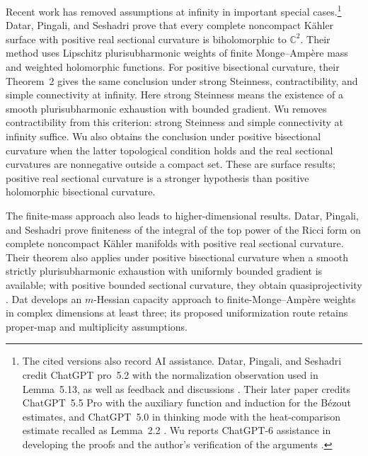 Recent work has removed assumptions at infinity in important special
cases.\footnote{The cited versions also record AI assistance.
Datar, Pingali, and Seshadri credit ChatGPT pro~5.2 with the normalization
observation used in Lemma~5.13, as well as feedback and discussions
\cite[Section~1.1 and Acknowledgments]{DatarPingaliSeshadri}.
Their later paper credits ChatGPT~5.5 Pro with the auxiliary function
and induction for the B\'ezout estimates, and ChatGPT~5.0 in thinking
mode with the heat-comparison estimate recalled as Lemma~2.2
\cite[Sections~1--3]{DatarPingaliSeshadriTop}.
Wu reports ChatGPT-6 assistance in developing the proofs and the
author's verification of the arguments
\cite[Acknowledgments]{WuConditional}.}
Datar, Pingali, and Seshadri
\cite[Theorem~1]{DatarPingaliSeshadri} prove that every complete noncompact
K\"ahler surface with positive real sectional curvature is biholomorphic
to $\mathbb C^2$. Their method uses Lipschitz plurisubharmonic weights of
finite Monge--Amp\`ere mass and weighted holomorphic functions.
For positive bisectional curvature, their Theorem~2 gives the same
conclusion under strong Steinness, contractibility, and simple
connectivity at infinity. Here strong Steinness means the existence of
a smooth plurisubharmonic exhaustion with bounded gradient.
Wu \cite[Corollaries~1.5--1.6]{WuConditional} removes contractibility
from this criterion: strong Steinness and simple connectivity at infinity
suffice. Wu also obtains the conclusion under positive bisectional curvature
when the latter topological condition holds and the real sectional
curvatures are nonnegative outside a compact set. These are surface results; positive real sectional
curvature is a stronger hypothesis than positive holomorphic bisectional
curvature.

The finite-mass approach also leads to higher-dimensional results.
Datar, Pingali, and Seshadri \cite[Theorem~1.1]{DatarPingaliSeshadriTop}
prove finiteness of the integral of the top power of the Ricci form on
complete noncompact K\"ahler manifolds with positive real sectional
curvature. Their theorem also applies under positive bisectional
curvature when a smooth strictly plurisubharmonic exhaustion with
uniformly bounded gradient is available; with positive bounded sectional
curvature, they obtain quasiprojectivity
\cite[Theorem~1.2]{DatarPingaliSeshadriTop}.
Dat \cite{DatHessian} develops an $m$-Hessian capacity approach to
finite-Monge--Amp\`ere weights in complex dimensions at least three;
its proposed uniformization route retains proper-map and multiplicity
assumptions.

